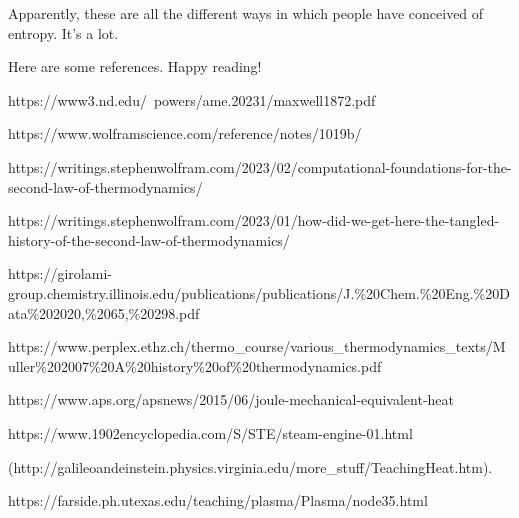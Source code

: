 \documentclass[12pt]{article}
\begin{document}
Apparently, these are all the different ways in which people have conceived of entropy. It's a lot.

Here are some references. Happy reading!

https://www3.nd.edu/~powers/ame.20231/maxwell1872.pdf

https://www.wolframscience.com/reference/notes/1019b/

https://writings.stephenwolfram.com/2023/02/computational-foundations-for-the-second-law-of-thermodynamics/

https://writings.stephenwolfram.com/2023/01/how-did-we-get-here-the-tangled-history-of-the-second-law-of-thermodynamics/

https://girolami-group.chemistry.illinois.edu/publications/publications/J.\%20Chem.\%20Eng.\%20Data\%202020,\%2065,\%20298.pdf

https://www.perplex.ethz.ch/thermo\_course/various\_thermodynamics\_texts/Muller\%202007\%20A\%20history\%20of\%20thermodynamics.pdf

https://www.aps.org/apsnews/2015/06/joule-mechanical-equivalent-heat

https://www.1902encyclopedia.com/S/STE/steam-engine-01.html

(http://galileoandeinstein.physics.virginia.edu/more\_stuff/TeachingHeat.htm).

https://farside.ph.utexas.edu/teaching/plasma/Plasma/node35.html
\end{document}
